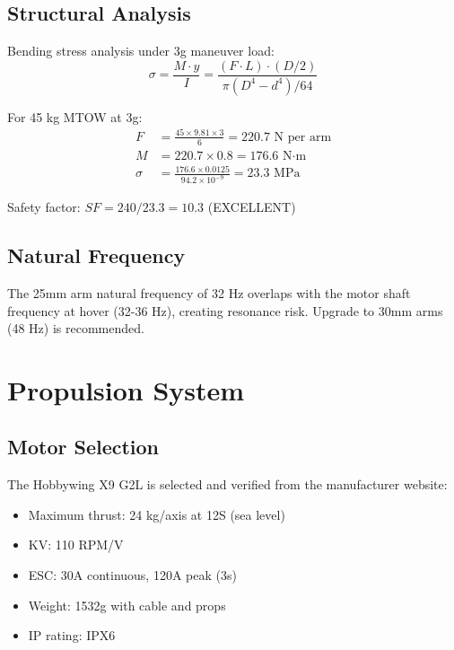 \documentclass[12pt,a4paper]{article}
\begin{document}
\subsection{Structural Analysis}
Bending stress analysis under 3g maneuver load:
\begin{equation}
    \sigma = \frac{M \cdot y}{I} = \frac{(F \cdot L) \cdot (D/2)}{\pi(D^4 - d^4)/64}
\end{equation}

For 45 kg MTOW at 3g:
\begin{align}
    F &= \frac{45 \times 9.81 \times 3}{6} = 220.7 \text{ N per arm} \\
    M &= 220.7 \times 0.8 = 176.6 \text{ N·m} \\
    \sigma &= \frac{176.6 \times 0.0125}{94.2 \times 10^{-9}} = 23.3 \text{ MPa}
\end{align}

Safety factor: $SF = 240/23.3 = 10.3$ (EXCELLENT)

\subsection{Natural Frequency}
The 25mm arm natural frequency of 32 Hz overlaps with the motor shaft frequency at hover (32-36 Hz), creating resonance risk. Upgrade to 30mm arms (48 Hz) is recommended.

\section{Propulsion System}

\subsection{Motor Selection}
The Hobbywing X9 G2L is selected and verified from the manufacturer website:
\begin{itemize}
    \item Maximum thrust: 24 kg/axis at 12S (sea level)
    \item KV: 110 RPM/V
    \item ESC: 30A continuous, 120A peak (3s)
    \item Weight: 1532g with cable and props
    \item IP rating: IPX6
\end{itemize}
\end{document}
